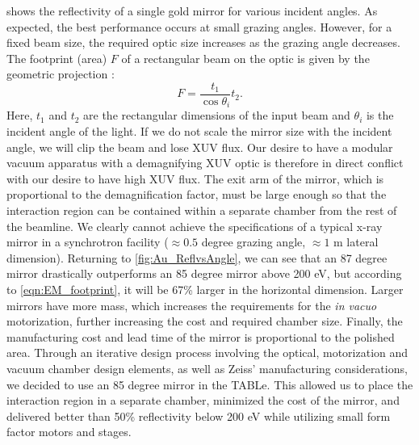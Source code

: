  shows the reflectivity of a single gold mirror for various incident angles. As expected, the best performance occurs at small grazing angles. However, for a fixed beam size, the required optic size increases as the grazing angle decreases. The footprint (area) $F$ of a rectangular beam on the optic is given by the geometric projection \cite{gibaudSpecularReflectivitySmooth2009}:
\begin{equation}
F = \frac{t_1}{\cos \theta_i}t_2.
\label{eqn:EM_footprint}
\end{equation}
Here, $t_1$ and $t_2$ are the rectangular dimensions of the input beam and $\theta_i$ is the incident angle of the light. If we do not scale the mirror size with the incident angle, we will clip the beam and lose XUV flux. Our desire to have a modular vacuum apparatus with a demagnifying XUV optic is therefore in direct conflict with our desire to have high XUV flux. The exit arm of the mirror, which is proportional to the demagnification factor, must be large enough so that the interaction region can be contained within a separate chamber from the rest of the beamline. We clearly cannot achieve the specifications of a typical x-ray mirror in a synchrotron facility ($\approx 0.5$ degree grazing angle, $\approx 1$ m lateral dimension). Returning to \cref{fig:Au_ReflvsAngle}, we can see that an 87 degree mirror drastically outperforms an 85 degree mirror above 200 eV, but according to \cref{eqn:EM_footprint}, it will be 67\% larger in the horizontal dimension. Larger mirrors have more mass, which increases the requirements for the \textit{in vacuo} motorization, further increasing the cost and required chamber size. Finally, the manufacturing cost and lead time of the mirror is proportional to the polished area. Through an iterative design process involving the optical, motorization and vacuum chamber design elements, as well as Zeiss' manufacturing considerations, we decided to use an 85 degree mirror in the TABLe. This allowed us to place the interaction region in a separate chamber, minimized the cost of the mirror, and delivered better than 50\% reflectivity below 200 eV while utilizing small form factor motors and stages. 

